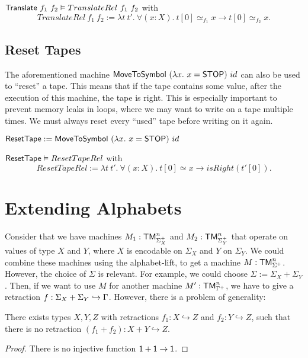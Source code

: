 \begin{lemma}
  $\mathsf{Translate}~f_1~f_2 \mathrel{\vDash} TranslateRel~f_1~f_2$ with
  \[
    TranslateRel~f_1~f_2 := \lambda t~t'.~\forall(x:X).~t[0] \simeq_{f_1} x \rightarrow t[0] \simeq_{f_2} x.
  \]
\end{lemma}


\subsection{Reset Tapes}
\label{sec:reset-tape}

The aforementioned machine $\mathsf{MoveToSymbol}~(\lambda x.~x=\mathsf{STOP})~id$ can also be used to ``reset'' a tape.  This means that if the tape contains
some value, after the execution of this machine, the tape is right.  This is especially important to prevent memory leaks in loops, where we may want
to write on a tape multiple times.  We must always reset every ``used'' tape before writing on it again.

\begin{definition}[$\MS{ResetTape}$][Reset]
  \label{def:Reset}
  $\mathsf{ResetTape} := \mathsf{MoveToSymbol}~(\lambda x.~x=\mathsf{STOP})~id$
\end{definition}

\begin{lemma}
  \label{lem:Reset_Realise}
  $\mathsf{ResetTape} \mathrel{\vDash} ResetTapeRel$ with
  \[
    ResetTapeRel := \lambda t~t'.~\forall(x:X).~t[0] \simeq x \rightarrow isRight(t'[0]).
  \]
\end{lemma}


\section{Extending Alphabets}
\label{sec:extend-alphabet}

Consider that we have machines $M_1 : \mathsf{TM}_{\Sigma_X^+}^n$ and $M_2 : \mathsf{TM}_{\Sigma_Y^+}^n$ that operate on values of type $X$ and $Y$, where $X$ is
encodable on $\Sigma_X$ and $Y$ on $\Sigma_Y$.  We could combine these machines using the alphabet-lift, to get a machine $M : \mathsf{TM}_{\Sigma^+}^n$.
However, the choice of $\Sigma$ is relevant.  For example, we could choose $\Sigma := \Sigma_X + \Sigma_Y$.  Then, if we want to use $M$ for another
machine $M' : \mathsf{TM}_{\Gamma^+}^n$, we have to give a retraction $f : \Sigma_X+\Sigma_Y \hookrightarrow \Gamma$.  However, there is a problem of generality:
\begin{fact}
  There exists types $X,Y,Z$ with retractions $f_1 : X \hookrightarrow Z$ and $f_2 : Y \hookrightarrow Z$, such that there is no retraction
  $(f_1+f_2) : X+Y \hookrightarrow Z$.
\end{fact}
\begin{proof}
  There is no injective function $\mathsf{1}+\mathsf{1}\rightarrow\mathsf{1}$.
\end{proof}

